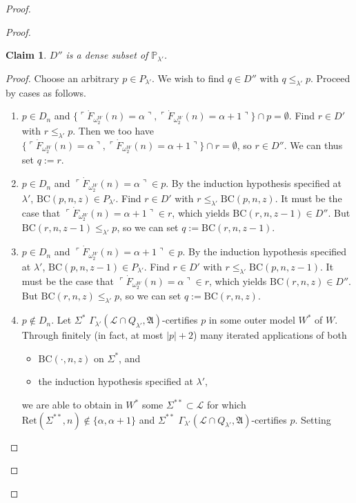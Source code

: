 \documentclass[12pt, twoside]{memoir}
\numberwithin{equation}{section}
\newtheorem*{claim}{Claim}
\theoremstyle{definition}
\theoremstyle{remark}
\theoremstyle{definition}
\theoremstyle{definition}
\theoremstyle{definition}
\theoremstyle{remark}
\begin{document}
\begin{proof}
\begin{proof}
\begin{claim}
$D''$ is a dense subset of $\mathbb{P}_{\lambda'}$.
\end{claim}

\begin{proof}
Choose an arbitrary $p \in P_{\lambda'}$. We wish to find $q \in D''$ with $q \leq_{\lambda'} p$. Proceed by cases as follows.
\begin{enumerate}[label=Case \arabic*:, leftmargin=50pt]
    \item\label{7411c1} $p \in D_n$ and $\{\ulcorner \dot{F}_{\omega_2^W}(n) = \alpha \urcorner, \ulcorner \dot{F}_{\omega_2^W}(n) = \alpha + 1\urcorner\} \cap p = \emptyset$. Find $r \in D'$ with $r \leq_{\lambda'} p$. Then we too have $\{\ulcorner \dot{F}_{\omega_2^W}(n) = \alpha \urcorner, \ulcorner \dot{F}_{\omega_2^W}(n) = \alpha + 1\urcorner\} \cap r = \emptyset$, so $r \in D''$. We can thus set $q := r$.
    \item $p \in D_n$ and $\ulcorner \dot{F}_{\omega_2^W}(n) = \alpha \urcorner \in p$. By the induction hypothesis specified at $\lambda'$, $\mathrm{BC}(p, n, z) \in P_{\lambda'}$. Find $r \in D'$ with $r \leq_{\lambda'} \mathrm{BC}(p, n, z)$. It must be the case that $\ulcorner \dot{F}_{\omega_2^W}(n) = \alpha + 1 \urcorner \in r$, which yields $\mathrm{BC}(r, n, z-1) \in D''$. But $\mathrm{BC}(r, n, z-1) \leq_{\lambda'} p$, so we can set $q := \mathrm{BC}(r, n, z-1)$.
    \item $p \in D_n$ and $\ulcorner \dot{F}_{\omega_2^W}(n) = \alpha + 1 \urcorner \in p$. By the induction hypothesis specified at $\lambda'$, $\mathrm{BC}(p, n, z-1) \in P_{\lambda'}$. Find $r \in D'$ with $r \leq_{\lambda'} \mathrm{BC}(p, n, z-1)$. It must be the case that $\ulcorner \dot{F}_{\omega_2^W}(n) = \alpha \urcorner \in r$, which yields $\mathrm{BC}(r, n, z) \in D''$. But $\mathrm{BC}(r, n, z) \leq_{\lambda'} p$, so we can set $q := \mathrm{BC}(r, n, z)$.
    \item\label{7411c4} $p \not\in D_n$. Let $\Sigma^*$ $\Gamma_{\lambda'} (\mathcal{L} \cap Q_{\lambda'}, \mathfrak{A})$-certifies $p$ in some outer model $W^*$ of $W$. Through finitely (in fact, at most $|p| + 2$) many iterated applications of both
    \begin{itemize}
        \item $\mathrm{BC}(\cdot, n, z)$ on $\Sigma^*$, and
        \item the induction hypothesis specified at $\lambda'$,
    \end{itemize}
    we are able to obtain in $W^*$ some $\Sigma^{**} \subset \mathcal{L}$ for which $\mathrm{Ret}(\Sigma^{**}, n) \not\in \{\alpha, \alpha+1\}$ and $\Sigma^{**}$ $\Gamma_{\lambda'} (\mathcal{L} \cap Q_{\lambda'}, \mathfrak{A})$-certifies $p$. Setting 

\end{enumerate}
\end{proof}
\end{proof}
\end{proof}
\end{document}
